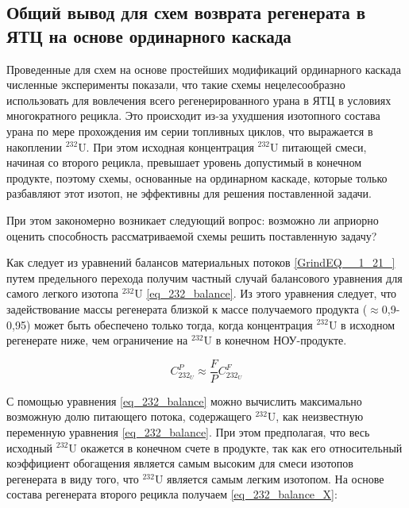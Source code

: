 \subsection{Общий вывод для схем возврата регенерата в ЯТЦ на основе ординарного каскада}

Проведенные для схем на основе простейших модификаций ординарного каскада численные эксперименты показали, что такие схемы нецелесообразно использовать для вовлечения всего регенерированного урана в ЯТЦ в условиях многократного рецикла. Это происходит из-за ухудшения изотопного состава урана по мере прохождения им серии топливных циклов, что выражается в накоплении $^{232}$U. При этом исходная концентрация $^{232}$U питающей смеси, начиная со второго рецикла, превышает уровень допустимый в конечном продукте, поэтому схемы, основанные на ординарном каскаде, которые только разбавляют этот изотоп, не эффективны для решения поставленной задачи.

При этом закономерно возникает следующий вопрос: возможно ли априорно оценить способность рассматриваемой схемы решить поставленную задачу? 

Как следует из уравнений балансов материальных потоков \ref{GrindEQ__1_21_} путем предельного перехода получим частный случай балансового уравнения для самого легкого изотопа $^{232}$U \ref{eq_232_balance}. Из этого уравнения следует, что задействование массы регенерата близкой к массе получаемого продукта ($\approx$0,9-0,95) может быть обеспечено только тогда, когда концентрация $^{232}$U в исходном регенерате ниже, чем ограничение на $^{232}$U в конечном НОУ-продукте. 


\begin{equation}
\label{eq_232_balance}
  C_{232_{U}}^{P} \approx \frac{F}{P} C_{232_{U}}^{F}
\end{equation}

С помощью уравнения \ref{eq_232_balance} можно вычислить максимально возможную долю питающего потока, содержащего $^{232}$U, как неизвестную переменную уравнения \ref{eq_232_balance}. При этом предполагая, что весь исходный $^{232}$U окажется в конечном счете в продукте, так как его относительный коэффициент обогащения является самым высоким для смеси изотопов регенерата в виду того, что $^{232}$U является самым легким изотопом. На основе состава регенерата второго рецикла получаем \ref{eq_232_balance_X}:


